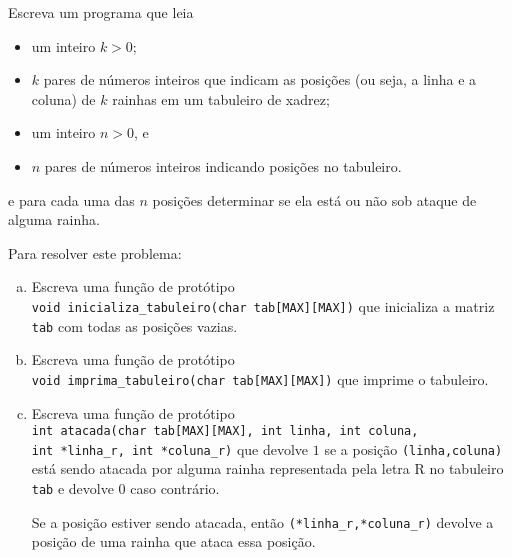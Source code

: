 \documentclass[a4paper]{memoir}
\begin{document}
\begin{prob}\label{prob314.cpp}
Escreva um programa que leia

\begin{itemize}
 \item um inteiro $k > 0$;
 \item $k$ pares de números inteiros que indicam as posições (ou seja, a linha e a coluna) de $k$ rainhas em um tabuleiro de xadrez;
 \item um inteiro $n > 0$, e
 \item $n$ pares de números inteiros indicando posições no tabuleiro.
\end{itemize}

e para cada uma das $n$ posições determinar se ela está ou não sob ataque de alguma rainha.

Para resolver este problema:

\begin{enumerate}[a)]
 \item Escreva uma função de protótipo\\
\verb|void inicializa_tabuleiro(char tab[MAX][MAX])| que inicializa a matriz \verb|tab| com todas as posições vazias.
  \item Escreva uma função de protótipo\\
\verb|void imprima_tabuleiro(char tab[MAX][MAX])| que imprime o tabuleiro.
  \item Escreva uma função de protótipo\\
\verb|int atacada(char tab[MAX][MAX], int linha, int coluna,|\\
\verb|int *linha_r, int *coluna_r)| que devolve $1$ se a posição \verb|(linha,coluna)| está sendo atacada por alguma rainha representada pela letra R no tabuleiro \verb|tab| e devolve $0$ caso contrário.

Se a posição estiver sendo atacada, então \verb|(*linha_r,*coluna_r)| devolve a posição de uma rainha que ataca essa posição.
\end{enumerate}

\end{prob}
\end{document}
